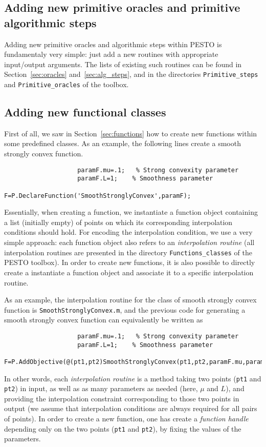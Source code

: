 \documentclass[11pt,a4paper]{article}
\begin{document}
					\subsection{Adding new primitive oracles and primitive algorithmic steps}

					Adding new primitive oracles and algorithmic steps within PESTO is fundamentaly very simple: just add a new routines with appropriate input/output arguments. The lists of existing such routines can be found in Section~\ref{sec:oracles} and~\ref{sec:alg_steps}, and in the directories \verb?Primitive_steps? and \verb?Primitive_oracles? of the toolbox.
					\subsection{Adding new functional classes}
					First of all, we saw in Section~\ref{sec:functions} how to create new functions within some predefined classes. As an example, the following lines create a smooth strongly convex function.\\[-1cm]
					\begin{lstlisting}
					paramF.mu=.1;	% Strong convexity parameter
					paramF.L=1;    % Smoothness parameter
					F=P.DeclareFunction('SmoothStronglyConvex',paramF);
					\end{lstlisting}
					Essentially, when creating a function, we instantiate a function object containing a list (initially empty) of points on which its corresponding interpolation conditions should hold. For encoding the interpolation condition, we use a very simple approach: each function object also refers to an \emph{interpolation routine} (all interpolation routines are presented in the directory \verb?Functions_classes? of the PESTO toolbox).
					In order to create new functions, it is also possible to directly create a instantiate a function object and associate it to a specific interpolation routine.

					As an example, the interpolation routine for the class of smooth strongly convex function is \verb?SmoothStronglyConvex.m?, and the previous code for generating a smooth strongly convex function can equivalently be written as\\[-1cm]
					\begin{lstlisting}
					paramF.mu=.1;	% Strong convexity parameter
					paramF.L=1;    % Smoothness parameter
					F=P.AddObjective(@(pt1,pt2)SmoothStronglyConvex(pt1,pt2,paramF.mu,paramF.L));
					\end{lstlisting}
					In other words, each \emph{interpolation routine} is a method taking two points (\verb?pt1? and \verb?pt2?) in input, as well as as many parameters as needed (here, $\mu$ and $L$), and providing the interpolation constraint corresponding to those two points in output (we assume that interpolation conditions are always required for all pairs of points). In order to create a new function, one has create a \emph{function handle} depending only on the two points (\verb?pt1? and \verb?pt2?), by fixing the values of the parameters.
\end{document}
